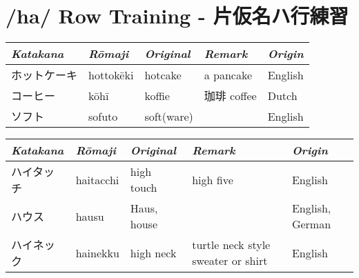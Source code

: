 \section{/ha/ Row Training - 片仮名ハ行練習}\label{sec:HaRowTraining}
\Padding
\begin{longtable}[c]{p{3cm}p{2cm}p{3cm}p{5cm}p{2cm}}
\textit{Katakana}&\textit{Rōmaji}&\textit{Original}&\textit{Remark}&\textit{Origin}\\\hline
ホットケーキ&hottokēki&hotcake    &a pancake                         &English\\
コーヒー    &kōhī     &koffie     &珈琲  coffee                      &Dutch\\
ソフト      &sofuto   &soft(ware) &                                  &English \\
\end{longtable}



\newpage
\Padding
\begin{longtable}[c]{p{2cm}p{2cm}p{3cm}p{6cm}p{2cm}}
\textit{Katakana}&\textit{Rōmaji}&\textit{Original}&\textit{Remark}&\textit{Origin}\\\hline
ハイタッチ  &haitacchi&high touch &high five                         &English\\
ハウス      &hausu    &Haus, house&                                  &English, German\\
ハイネック  &hainekku &high neck  &turtle neck style sweater or shirt&English\\
\end{longtable}


\newpage
